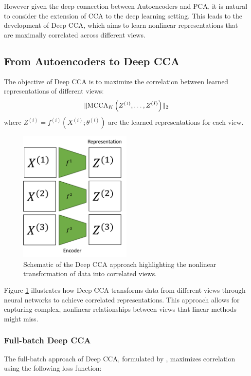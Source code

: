 However given the deep connection between Autoencoders and PCA, it is natural to consider the extension of CCA to the deep learning setting. This leads to the development of Deep CCA, which aims to learn nonlinear representations that are maximally correlated across different views.

\subsection{From Autoencoders to Deep CCA}

The objective of Deep CCA is to maximize the correlation between learned representations of different views:
\begin{align}
\label{eq:DMCCA-def}
\lVert\operatorname{MCCA}_K\left(Z^{(1)}, \ldots, Z^{(I)}\right)\rVert_2
\end{align}
where $Z^{(i)} = f^{(i)}(X^{(i)}; \theta^{(i)})$ are the learned representations for each view.
\begin{figure}
\centering
\includegraphics[width=0.5\textwidth]{figures/dcca_schematic}
\caption{Schematic of the Deep CCA approach highlighting the nonlinear transformation of data into correlated views.}
\label{fig:dcca_schematic}
\end{figure}
Figure \ref{fig:dcca_schematic} illustrates how Deep CCA transforms data from different views through neural networks to achieve correlated representations. This approach allows for capturing complex, nonlinear relationships between views that linear methods might miss.

\subsubsection{Full-batch Deep CCA}
The full-batch approach of Deep CCA, formulated by \citet{andrew2013deep}, maximizes correlation using the following loss function:

